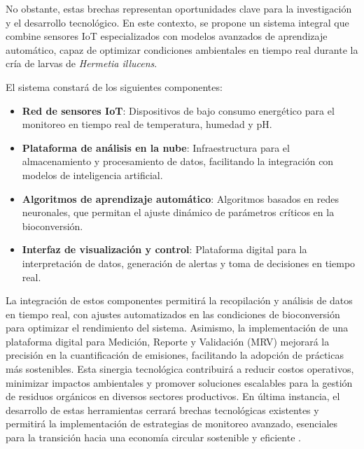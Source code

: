 No obstante, estas brechas representan oportunidades clave para la investigación y el desarrollo tecnológico. En este contexto, se propone un sistema integral que combine sensores IoT especializados con modelos avanzados de aprendizaje automático, capaz de optimizar condiciones ambientales en tiempo real durante la cría de larvas de \textit{Hermetia illucens}. 

El sistema constará de los siguientes componentes:
\begin{itemize}
    \item \textbf{Red de sensores IoT}: Dispositivos de bajo consumo energético para el monitoreo en tiempo real de temperatura, humedad y pH.
    \item \textbf{Plataforma de análisis en la nube}: Infraestructura para el almacenamiento y procesamiento de datos, facilitando la integración con modelos de inteligencia artificial.
    \item \textbf{Algoritmos de aprendizaje automático}: Algoritmos basados en redes neuronales, que permitan el ajuste dinámico de parámetros críticos en la bioconversión.
    \item \textbf{Interfaz de visualización y control}: Plataforma digital para la interpretación de datos, generación de alertas y toma de decisiones en tiempo real.
\end{itemize}

La integración de estos componentes permitirá la recopilación y análisis de datos en tiempo real, con ajustes automatizados en las condiciones de bioconversión para optimizar el rendimiento del sistema. Asimismo, la implementación de una plataforma digital para Medición, Reporte y Validación (MRV) mejorará la precisión en la cuantificación de emisiones, facilitando la adopción de prácticas más sostenibles. Esta sinergia tecnológica contribuirá a reducir costos operativos, minimizar impactos ambientales y promover soluciones escalables para la gestión de residuos orgánicos en diversos sectores productivos. En última instancia, el desarrollo de estas herramientas cerrará brechas tecnológicas existentes y permitirá la implementación de estrategias de monitoreo avanzado, esenciales para la transición hacia una economía circular sostenible y eficiente \parencite{ahmedAgricultureClimateChange2020,vanIntegrationInternetofThingsSustainable2022}.

